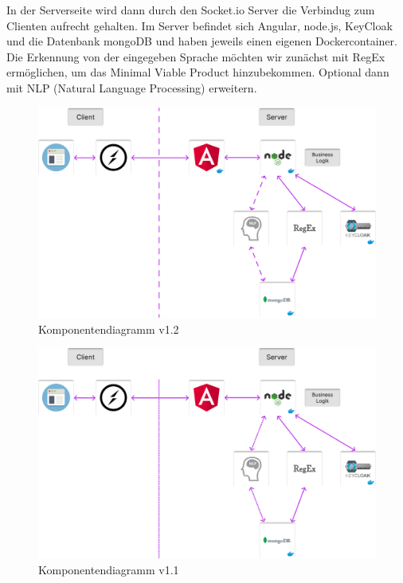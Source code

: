 \noindent In der Serverseite wird dann durch den Socket.io Server die Verbindug zum Clienten aufrecht gehalten.
Im Server befindet sich Angular, node.js, KeyCloak und die Datenbank mongoDB und haben jeweils einen eigenen Dockercontainer. 
Die Erkennung von der eingegeben Sprache möchten wir zunächst mit RegEx ermöglichen, 
um das Minimal Viable Product hinzubekommen. Optional dann mit NLP (Natural Language Processing) erweitern.

\begin{figure}[!hbt]
\centering
\includegraphics[width=1.0\textwidth]{bilder/technologien/Komponentendiagram v1.2.png}
\caption{Komponentendiagramm v1.2}
\label{fig:Komponentendiagramm_v1.2}
\end{figure}

\begin{figure}[!hbt]
\centering
\includegraphics[width=1.0\textwidth]{bilder/technologien/Komponentendiagram v1.1.png}
\caption{Komponentendiagramm v1.1}
\label{fig:Komponentendiagramm_v1.1}
\end{figure}

